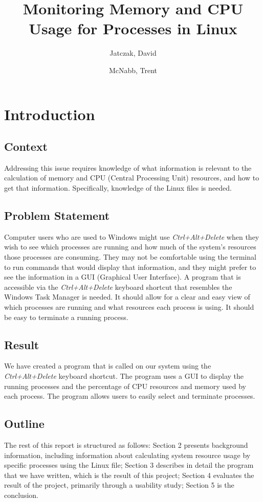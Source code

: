 \documentclass[12pt]{article}
\title{Monitoring Memory and CPU Usage for Processes in Linux}
\author{Jatczak, David \and McNabb, Trent}
\begin{document}
	
	\maketitle
	
	\section{Introduction}
	
	\subsection{Context}
	Addressing this issue requires knowledge of what information is relevant to the calculation of memory and CPU (Central Processing Unit) resources, and how to get that information. Specifically, knowledge of the Linux  files is needed.
	
	\subsection{Problem Statement}
	Computer users who are used to Windows might use \emph{Ctrl+Alt+Delete} when they wish to see which processes are running and how much of the system's resources those processes are consuming. They may not be comfortable using the terminal to run commands that would display that information, and they might prefer to see the information in a GUI (Graphical User Interface). A program that is accessible via the \emph{Ctrl+Alt+Delete} keyboard shortcut that resembles the Windows Task Manager is needed. It should allow for a clear and easy view of which processes are running and what resources each process is using. It should be easy to terminate a running process.
	
	\subsection{Result}
We have created a program that is called on our system using the \emph{Ctrl+Alt+Delete} keyboard shortcut. The program uses a GUI to display the running processes and the percentage of CPU resources and memory used by each process. The program allows users to easily select and terminate processes.
	
	\subsection{Outline}
	The rest of this report is structured as follows: Section 2 presents background information, including information about calculating system resource usage by specific processes using the Linux  file; Section 3 describes in detail the program that we have written, which is the result of this project; Section 4 evaluates the result of the project, primarily through a usability study; Section 5 is the conclusion.
	
\end{document}
